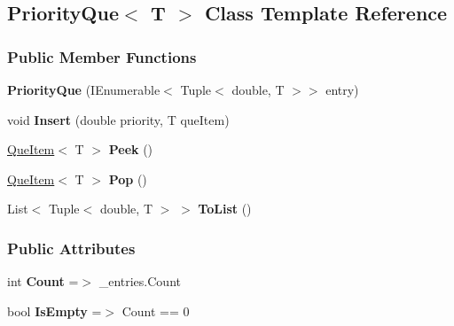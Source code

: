 \hypertarget{classDataTools_1_1utils_1_1PriorityQue}{}\subsection{Priority\+Que$<$ T $>$ Class Template Reference}
\label{classDataTools_1_1utils_1_1PriorityQue}
\subsubsection*{Public Member Functions}
\begin{DoxyCompactItemize}
\item 
\mbox{\label{classDataTools_1_1utils_1_1PriorityQue_a71333bb99314f4112f3d79b75fba83cf}} 
{\bfseries Priority\+Que} (I\+Enumerable$<$ Tuple$<$ double, T $>$$>$ entry)
\item 
\mbox{\label{classDataTools_1_1utils_1_1PriorityQue_ab824f9a104dc1a7623f5803d8dfced87}} 
void {\bfseries Insert} (double priority, T que\+Item)
\item 
\mbox{\label{classDataTools_1_1utils_1_1PriorityQue_aae3e6be1e179db7597e45466290dd6b0}} 
\hyperlink{classDataTools_1_1utils_1_1QueItem}{Que\+Item}$<$ T $>$ {\bfseries Peek} ()
\item 
\mbox{\label{classDataTools_1_1utils_1_1PriorityQue_a0a49e76c3c4756a635bbe7c55add2afa}} 
\hyperlink{classDataTools_1_1utils_1_1QueItem}{Que\+Item}$<$ T $>$ {\bfseries Pop} ()
\item 
\mbox{\label{classDataTools_1_1utils_1_1PriorityQue_ac075b80510e235ba9703b8a8c610275a}} 
List$<$ Tuple$<$ double, T $>$ $>$ {\bfseries To\+List} ()
\end{DoxyCompactItemize}
\subsubsection*{Public Attributes}
\begin{DoxyCompactItemize}
\item 
\mbox{\label{classDataTools_1_1utils_1_1PriorityQue_aad462966ed963f892117056de1eba502}} 
int {\bfseries Count} =$>$ \+\_\+entries.\+Count
\item 
\mbox{\label{classDataTools_1_1utils_1_1PriorityQue_aaaa6c7dd3bd14dc2ce7f0780de528bb1}} 
bool {\bfseries Is\+Empty} =$>$ Count == 0
\end{DoxyCompactItemize}
